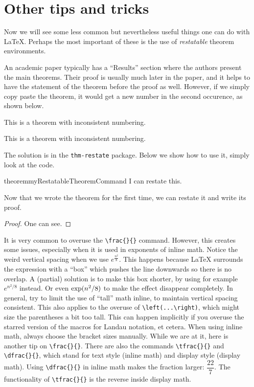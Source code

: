 \section{Other tips and tricks}
Now we will see some less common but nevertheless useful things one can do with \LaTeX{}. Perhaps the 
most important of these is the use of \emph{restatable} theorem environments. 
\begin{Rule}[Restatables] An academic paper typically has 
a ``Results'' section where the authors present the main theorems. Their proof is usually much later in the paper,
and it helps to have the statement of the theorem before the proof as well. However, if we simply copy paste the 
theorem, it would get a new number in the second occurence, as shown below.
\begin{theorem}
    This is a theorem with inconsistent numbering.
\end{theorem}
\begin{theorem}
    This is a theorem with inconsistent numbering.
\end{theorem}
The solution is in the \lstinline|thm-restate| package. Below we show how to use it, simply look at the code.
\begin{restatable}{theorem}{myRestatableTheoremCommand}
    \label{theorem:myRestatableTheorem}
    I can restate this.
    \end{restatable}
Now that we wrote the theorem for the first time, we can restate it and write its proof.
\myRestatableTheoremCommand*
\begin{proof}
    One can see.
\end{proof}
\end{Rule}
\begin{Rule}\label{rule:vertical_spacing} It is very common to overuse the \lstinline|\frac{}{}| command. However, this creates some issues, especially 
when it is used in exponents of inline math. Notice the weird vertical spacing when we use $e^{\frac{n^2}{8}}$.
This happens because \LaTeX{} surrounds the expression with a ``box'' which pushes the line downwards so there 
is no overlap. A (partial) solution is to make this box shorter, by using for example $e^{n^2/8}$ instead. Or even $\Exp{n^2/8}$ 
to make the effect disappear completely. In general, try to limit the use of ``tall'' math inline, 
to maintain vertical spacing consistent. This also applies to the overuse of \lstinline|\left(...\right)|,
which might size the parentheses a bit too tall. This can happen implicitly if you overuse the starred version of the macros for Landau notation, et cetera. When using inline math, always choose the 
bracket sizes manually.
While we are at it, here is another tip on \lstinline|\frac{}{}|. 
There are also the commands \lstinline|\tfrac{}{}| and \lstinline|\dfrac{}{}|, which stand for text style (inline math)
and display style (display math). Using \lstinline|\dfrac{}{}| in inline math makes the fraction larger: $\dfrac{22}{7}$.
The functionality of \lstinline|\tfrac{}{}| is the reverse inside display math.
\end{Rule}

